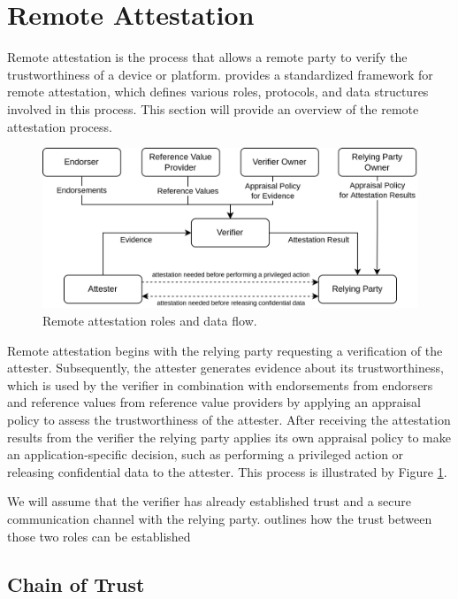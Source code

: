 \section{Remote Attestation}
\label{sec:remote-attestation}

Remote attestation is the process that allows a remote party to verify the
trustworthiness of a device or platform.  \cite{rfc9334}
provides a standardized framework for remote attestation, which defines various
roles, protocols, and data structures involved in this process. This section
will provide an overview of the remote attestation process.

\begin{figure}[H]
  \centering
  \includegraphics[width=0.8\linewidth]{resources/rats-data-flow.drawio.png}
  \caption{Remote attestation roles and data flow.}
  \label{fig:rats-data-flow}
\end{figure}


Remote attestation begins with the relying party requesting a verification of
the attester. Subsequently, the attester generates evidence about its
trustworthiness, which is used by the verifier in combination with endorsements
from endorsers and reference values from reference value providers by applying
an appraisal policy to assess the trustworthiness of the attester. After
receiving the attestation results from the verifier the relying party applies
its own appraisal policy to make an application-specific decision, such as
performing a privileged action or releasing confidential data to the attester.
This process is illustrated by Figure \ref{fig:rats-data-flow}.

We will assume that the verifier has already established trust and a secure
communication channel with the relying party.  outlines how
the trust between those two roles can be established \cite[Section~7.1]{rfc9334}

\subsection{Chain of Trust}
\label{sec:ra-chain-of-trust}

